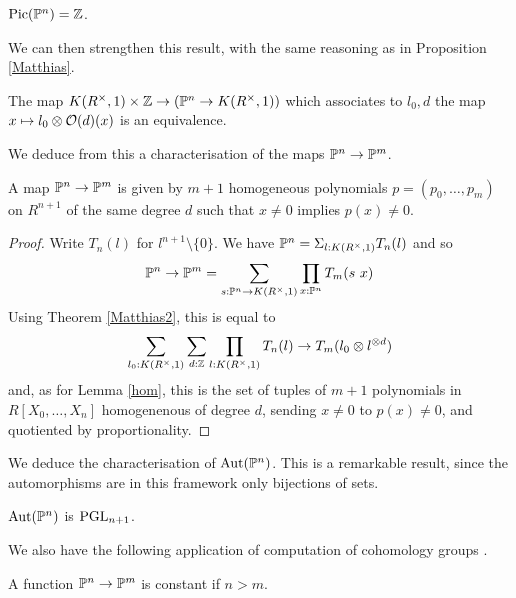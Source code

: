 \begin{corollary}
  $\mathrm{Pic}(\mathbb{P}^n) = \mathbb{Z}$.
\end{corollary}

We can then strengthen this result, with the same reasoning as in Proposition \ref{Matthias}.

\begin{theorem}\label{Matthias2}
  The map $K(R^{\times},1)\times\mathbb{Z}\rightarrow (\mathbb{P}^n\rightarrow K(R^{\times},1))$
  which associates to $l_0,d$ the map $x\mapsto l_0\otimes \mathcal{O}(d)(x)$ is an equivalence.
\end{theorem}

We deduce from this a characterisation of the maps $\mathbb{P}^n\rightarrow\mathbb{P}^m$.%

\begin{corollary}\label{map}
  A map $\mathbb{P}^n\rightarrow\mathbb{P}^m$ is given by $m+1$ homogeneous polynomials $p = (p_0,\dots,p_m)$ on $R^{n+1}$
  of the same   degree $d$ such that $x\neq 0$ implies $p(x)\neq 0$.
\end{corollary}

\begin{proof}
Write $T_n(l)$ for $l^{n+1}\setminus\{0\}$. We have $\mathbb{P}^n = \Sigma_{l:K(R^{\times},1)}T_n(l)$ and so
$$
\mathbb{P}^n\rightarrow\mathbb{P}^m = \sum_{s:\mathbb{P}^n\rightarrow K(R^{\times},1)}\prod_{x:\mathbb{P}^n}T_m(s~x)
$$
Using Theorem \ref{Matthias2}, this is equal to
$$
\sum_{l_0:K(R^{\times},1)}\sum_{d:\mathbb{Z}}\prod_{l:K(R^{\times},1)}T_n(l)\rightarrow T_m(l_0\otimes l^{\otimes d})
$$
and, as for Lemma \ref{hom}, this is the set of tuples of $m+1$ polynomials in $R[X_0,\dots,X_n]$ homogenenous
of degree $d$, sending $x\neq 0$ to $p(x)\neq 0$, and quotiented by proportionality.
\end{proof}

We deduce the characterisation of $\mathrm{Aut}(\mathbb{P}^n)$. This is a
remarkable result, since the automorphisms are in this framework only bijections of sets.

\begin{corollary}
  $\mathrm{Aut}(\mathbb{P}^n)$ is $\operatorname{PGL}_{n+1}$.
\end{corollary}

We also have the following application of computation of cohomology groups \cite{draft}.

\begin{corollary}
A function $\mathbb{P}^n\rightarrow\mathbb{P}^m$ is constant if $n>m$.
\end{corollary}

